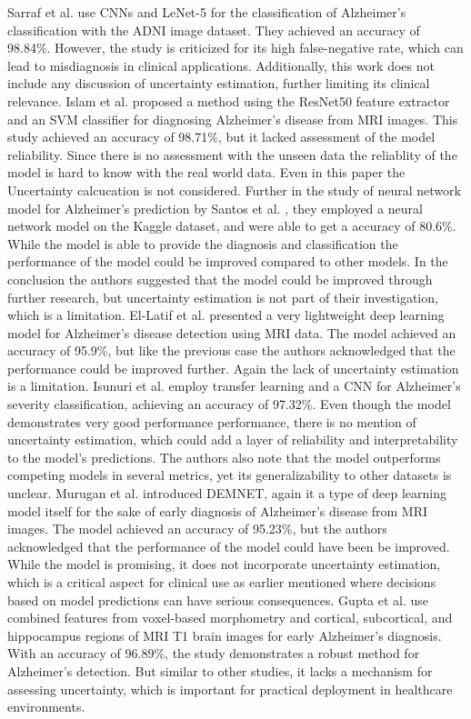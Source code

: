 \documentclass[12pt,twocolumn]{report}
\begin{document}
Sarraf et al. \cite{sarraf2016} use CNNs and LeNet-5 for the classification of Alzheimer’s classification with the ADNI image dataset. They achieved an accuracy of 98.84\%. However, the study is criticized for its high false-negative rate, which can lead to misdiagnosis in clinical applications. Additionally, this work does not include any discussion of uncertainty estimation, further limiting its clinical relevance. Islam et al. \cite{Islam2023} proposed a method using the ResNet50 feature extractor and an SVM classifier for diagnosing Alzheimer’s disease from MRI images. This study achieved an accuracy of 98.71\%, but it lacked assessment of the model reliability. Since there is no assessment with the unseen data the reliablity of the model is hard to know with the real world data. Even in this paper the Uncertainty calcucation is not considered. Further in the study of neural network model for Alzheimer’s prediction by Santos et al. \cite{Santos2023}, they employed a neural network model on  the Kaggle dataset, and were able to get a accuracy of 80.6\%. While the model is able to provide the diagnosis and classification the performance of the model could be improved compared to other models. In the conclusion the authors suggested that the model could be improved through further research, but uncertainty estimation is not part of their investigation, which is a limitation. El-Latif et al. \cite{Latif2023} presented a very lightweight deep learning model for Alzheimer’s disease detection using MRI data. The model achieved an accuracy of 95.9\%, but like the previous case the authors acknowledged that the performance could be improved further. Again the lack of uncertainty estimation is a limitation. Isunuri et al. \cite{Isunuri2023} employ transfer learning and a CNN for Alzheimer’s severity classification, achieving an accuracy of 97.32\%. Even though the model demonstrates very good performance performance, there is no mention of uncertainty estimation, which could add a layer of reliability and interpretability to the model’s predictions. The authors also note that the model outperforms competing models in several metrics, yet its generalizability to other datasets is unclear.
Murugan et al. \cite{Murugan2021} introduced DEMNET, again it a type of deep learning model itself for the sake of early diagnosis of Alzheimer’s disease from MRI images. The model achieved an accuracy of 95.23\%, but the authors acknowledged that the performance of the model could have been be improved. While the model is promising, it does not incorporate uncertainty estimation, which is a critical aspect for clinical use as earlier mentioned where decisions based on model predictions can have serious consequences. Gupta et al. \cite{Gupta2019} use combined features from voxel-based morphometry and cortical, subcortical, and hippocampus regions of MRI T1 brain images for early Alzheimer’s diagnosis. With an accuracy of 96.89\%, the study demonstrates a robust method for Alzheimer’s detection. But similar to other studies, it lacks a mechanism for assessing uncertainty, which is important for practical deployment in healthcare environments.
\end{document}
